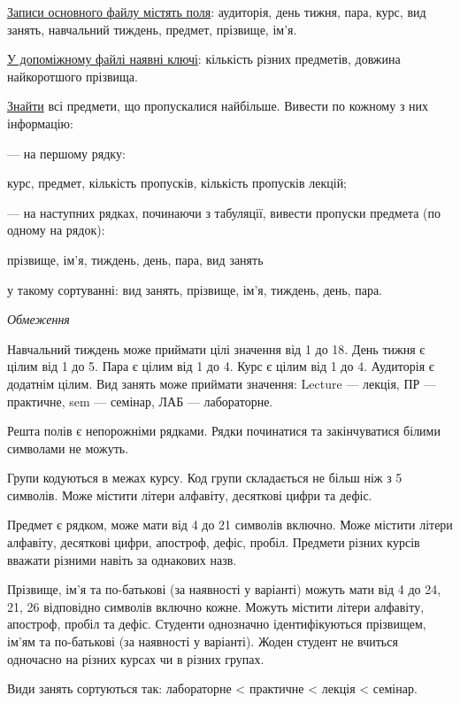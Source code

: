 \documentclass[11pt, ukrainian]{article}
\begin{document}
\underline{Записи основного файлу містять поля}: аудиторія, день тижня, пара, курс, вид занять, навчальний тиждень, предмет, прізвище, ім’я.

\underline{У допоміжному файлі наявні ключі}: кількість різних предметів, довжина найкоротшого прізвища.

\underline{Знайти} всі предмети, що пропускалися найбільше. Вивести по кожному з них інформацію:\par
{\noindent}--- на першому рядку:\par
курс, предмет, кількість пропусків, кількість пропусків лекцій;

{\noindent}--- на наступних рядках, починаючи з табуляції, вивести пропуски предмета (по одному на рядок):\par
прізвище, ім’я, тиждень, день, пара, вид занять

{\noindent}у такому сортуванні: вид занять, прізвище, ім’я, тиждень, день, пара.


\bigskip\textit{Обмеження}

Навчальний тиждень може приймати цілі значення від 1 до 18.
День тижня є цілим від 1 до 5. Пара є цілим від 1 до 4.
Курс є цілим від 1 до 4. Аудиторія є додатнім цілим.
Вид занять може приймати значення:
Lecture --- лекція, ПР --- практичне, sem --- семінар, ЛАБ --- лабораторне.

Решта полів є непорожніми рядками.
Рядки починатися та закінчуватися білими символами не можуть.

Групи кодуються в межах курсу.
Код групи складається не більш ніж з 5 символів.
Може містити літери алфавіту, десяткові цифри та дефіс.

Предмет є рядком, може мати від 4 до 21 символів включно.
Може містити літери алфавіту, десяткові цифри, апостроф, дефіс, пробіл.
Предмети різних курсів вважати різними навіть за однакових назв.

Прізвище, ім’я та по-батькові (за наявності у варіанті)
можуть мати від 4 до 24, 21, 26 відповідно символів включно кожне.
Можуть містити літери алфавіту, апостроф, пробіл та дефіс.
Студенти однозначно ідентифікуються прізвищем, ім’ям та по-батькові (за наявності у варіанті).
Жоден студент не вчиться одночасно на різних курсах чи в різних групах.

Види занять сортуються так: лабораторне < практичне < лекція < семінар.

\end{document}

